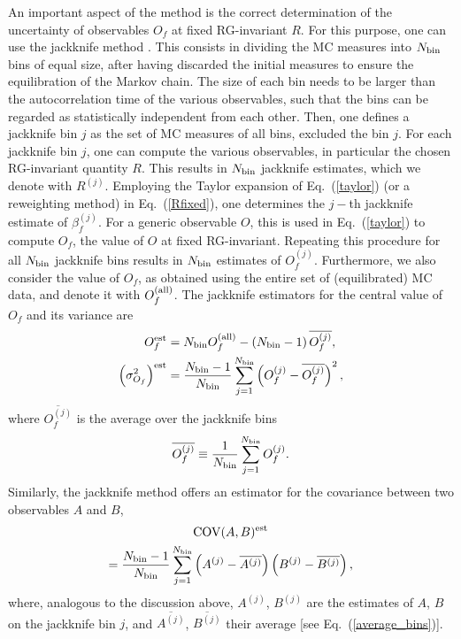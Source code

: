 \documentclass[pre,twocolumn]{revtex4-2}
\begin{document}
An important aspect of the method is the correct determination of the uncertainty of observables $O_f$ at fixed RG-invariant $R$.
For this purpose, one can use the jackknife method \cite{Young_notes}.
This consists in dividing the MC measures into $N_{\rm bin}$ bins of equal size, after having discarded the initial measures to ensure the equilibration of the Markov chain.
The size of each bin needs to be larger than the autocorrelation time of the various observables, such that the bins can be regarded as statistically independent from each other.
Then, one defines a jackknife bin $j$ as the set of MC measures of all bins, excluded the bin $j$.
For each jackknife bin $j$, one can compute the various observables, in particular the chosen RG-invariant quantity $R$.
This results in $N_{\rm bin}$ jackknife estimates, which we denote with $R^{(j)}$.
Employing the Taylor expansion of Eq.~(\ref{taylor}) (or a reweighting method) in Eq.~(\ref{Rfixed}), one determines the $j-$th jackknife estimate of $\beta_f^{(j)}$.
For a generic observable $O$, this is used in Eq.~(\ref{taylor}) to compute $O_f$, the value of $O$ at fixed RG-invariant.
Repeating this procedure for all $N_{\rm bin}$ jackknife bins results in  $N_{\rm bin}$ estimates of $O_f^{(j)}$.
Furthermore, we also consider the value of $O_f$, as obtained using the entire set of (equilibrated) MC data, and denote it with $O_f^{({\rm all})}$.
The jackknife estimators for the central value of $O_f$ and its variance are \cite{Young_notes}
\begin{align}
  \label{jackknife_mean}
  O_f^{\rm est} &= N_{\rm bin}O_f^{({\rm all})} - \left(N_{\rm bin}-1\right)\overline{O_f^{(j)}},\\
  \label{jackknife_sigma}
  \left(\sigma_{O_f}^2\right)^{\rm est} &= \frac{N_{\rm bin}-1}{N_{\rm bin}}\sum_{j=1}^{N_{\rm bin}}\left(O_f^{(j)}-\overline{O_f^{(j)}}\right)^2,
\end{align}
where $\overline{O_f^{(j)}}$ is the average over the jackknife bins
\begin{equation}
  \overline{O_f^{(j)}} \equiv  \frac{1}{N_{\rm bin}}\sum_{j=1}^{N_{\rm bin}}O_f^{(j)}.
  \label{average_bins}
\end{equation}
Similarly, the jackknife method offers an estimator for the covariance between two observables $A$ and $B$,
\begin{multline}
    {\rm COV}(A, B)^{\rm est} \\
    = \frac{N_{\rm bin}-1}{N_{\rm bin}}\sum_{j=1}^{N_{\rm bin}}\left(A^{(j)}-\overline{A^{(j)}}\right)\left(B^{(j)}-\overline{B^{(j)}}\right),
  \label{jackknife_covariance}
\end{multline}
where, analogous to the discussion above, $A^{(j)}$, $B^{(j)}$ are the estimates of $A$, $B$ on the jackknife bin $j$, and $\overline{A^{(j)}}$, $\overline{B^{(j)}}$ their average [see Eq.~(\ref{average_bins})].
\end{document}
